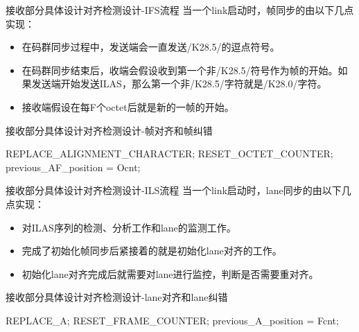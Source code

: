 \documentclass{beamer}
\begin{document}
\begin{frame}{接收部分具体设计}{对齐检测设计-IFS流程}
  当一个link启动时，帧同步的由以下几点实现：
  \begin{itemize}
    \item 在码群同步过程中，发送端会一直发送/K28.5/的逗点符号。
    \item 在码群同步结束后，收端会假设收到第一个非/K28.5/符号作为帧的开始。如果发送端开始发送ILAS，那么第一个非/K28.5/字符就是/K28.0/字符。
    \item 接收端假设在每F个octet后就是新的一帧的开始。
  \end{itemize}
\end{frame}

\begin{frame}{接收部分具体设计}{对齐检测设计-帧对齐和帧纠错}
  \begin{algorithmic}
  		\State REPLACE\_ALIGNMENT\_CHARACTER;
  			\State RESET\_OCTET\_COUNTER;
  		\EndIf
  			\State previous\_AF\_position = Ocnt;
  		\EndIf
  	\EndIf
  \end{algorithmic}
\end{frame}

\begin{frame}{接收部分具体设计}{对齐检测设计-ILS流程}
  当一个link启动时，lane同步的由以下几点实现：
  \begin{itemize}
    \item 对ILAS序列的检测、分析工作和lane的监测工作。
    \item 完成了初始化帧同步后紧接着的就是初始化lane对齐的工作。
    \item 初始化lane对齐完成后就需要对lane进行监控，判断是否需要重对齐。
  \end{itemize}
\end{frame}

\begin{frame}{接收部分具体设计}{对齐检测设计-lane对齐和lane纠错}
  \begin{algorithmic}
  		\State REPLACE\_A;
  			\State RESET\_FRAME\_COUNTER;
  		\EndIf
  			\State previous\_A\_position = Fcnt;
  		\EndIf
  	\EndIf
  \end{algorithmic}
\end{frame}
\end{document}
